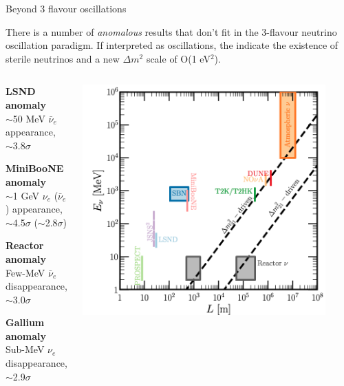 %
%
%

\begin{frame}{Beyond 3 flavour oscillations}

{\small
  There is a number of {\em anomalous} results that don't fit in the
  3-flavour neutrino oscillation paradigm. If interpreted as oscillations,
  the indicate the existence of sterile neutrinos and a new $\Delta m^2$ scale
  of O(1 eV$^2$). \\
}

  \begin{columns}
    \begin{column}{0.45\textwidth}
      \begin{itemize}
      {\small
        \item {\bf LSND anomaly}\\
           $\sim$50 MeV $\bar{\nu}_{e}$ appearance,\\ $\sim$3.8$\sigma$
        \item {\bf MiniBooNE anomaly}\\
           $\sim$1 GeV $\nu_{e}$ ($\bar{\nu}_{e}$) appearance,\\ $\sim$4.5$\sigma$ ($\sim$2.8$\sigma$)
        \item {\bf Reactor anomaly}\\
           Few-MeV $\bar{\nu}_{e}$ disappearance,\\ $\sim$3.0$\sigma$
        \item {\bf Gallium anomaly}\\
           Sub-MeV $\nu_{e}$ disappearance,\\ $\sim$2.9$\sigma$
      }
      \end{itemize}
    \end{column}
    \begin{column}{0.55\textwidth}
      \includegraphics[width=0.90\textwidth]{./images/osc101/expt_L_E}
    \end{column}
  \end{columns}


\end{frame}
